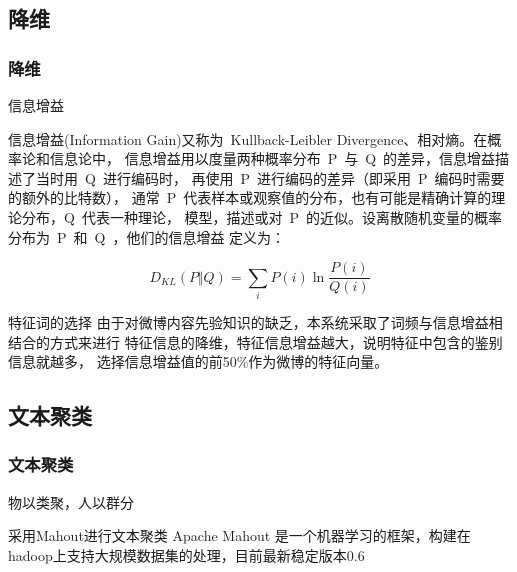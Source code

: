 \documentclass[CJKutf8, table]{beamer}
\begin{document}
\begin{CJK}{UTF8}{gbsn}
\subsection{降维}
\begin{frame}
  \frametitle{降维}
  \begin{block}{信息增益}
    \begin{tiny}
    信息增益(Information Gain)又称为~Kullback-Leibler Divergence、相对熵。在概率论和信息论中，
    信息增益用以度量两种概率分布~P~与~Q~的差异，信息增益描述了当时用~Q~进行编码时，
    再使用~P~进行编码的差异（即采用~P~编码时需要的额外的比特数），
    通常~P~代表样本或观察值的分布，也有可能是精确计算的理论分布，Q~代表一种理论，
    模型，描述或对~P~的近似。设离散随机变量的概率分布为~P~和~Q~，他们的信息增益
    定义为：
    \end{tiny}
    \pause
    $$D_{KL}(P \Vert Q) = \sum_iP(i) \ln \frac{P(i)}{Q(i)}
    $$
  \end{block}
  \pause
  \begin{block}{特征词的选择}
    由于对微博内容先验知识的缺乏，本系统采取了词频与信息增益相结合的方式来进行
    特征信息的降维，特征信息增益越大，说明特征中包含的鉴别信息就越多，
    选择信息增益值的前50\%作为微博的特征向量。
  \end{block}
\end{frame}

\subsection{文本聚类}
\begin{frame}
  \frametitle{文本聚类}
  \begin{block}{}
    \begin{center}物以类聚，人以群分\end{center}
  \end{block}
  \pause
  \begin{block}{采用Mahout进行文本聚类}
    Apache Mahout 是一个机器学习的框架，构建在hadoop上支持大规模数据集的处理，目前最新稳定版本0.6
  \end{block}
\end{frame}


\end{CJK}
\end{document}
